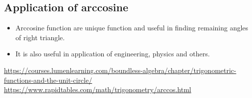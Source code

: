 \documentclass[a4paper,10pt]{report}
\begin{document}
\subsection{Application of arccosine}
\begin{itemize}[noitemsep]
\item Arccosine function are unique function and useful in finding remaining angles of right triangle.
\item It is also useful in application of engineering, physics and others.
\end{itemize}


\begin{thebibliography}{9}
\url{https://courses.lumenlearning.com/boundless-algebra/chapter/trigonometric-functions-and-the-unit-circle/}
\url{https://www.rapidtables.com/math/trigonometry/arccos.html}
\end{thebibliography}
\end{document}
